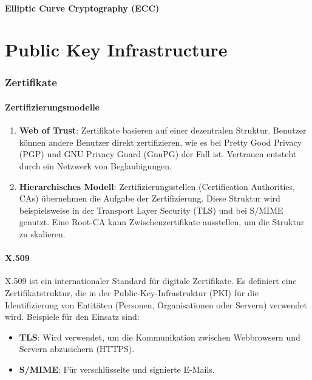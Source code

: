 \documentclass{article}
\begin{document}
\subsection{Elliptic Curve Cryptography (ECC)}




\part{Public Key Infrastructure}

\section{Zertifikate}

\subsection{Zertifizierungsmodelle}
\begin{enumerate}
  \item \textbf{Web of Trust}: Zertifikate basieren auf einer dezentralen Struktur. Benutzer können andere Benutzer direkt zertifizieren, wie es bei Pretty Good Privacy (PGP) und GNU Privacy Guard (GnuPG) der Fall ist. Vertrauen entsteht durch ein Netzwerk von Beglaubigungen.
  \item \textbf{Hierarchisches Modell}: Zertifizierungsstellen (Certification Authorities, CAs) übernehmen die Aufgabe der Zertifizierung. Diese Struktur wird beispielsweise in der Transport Layer Security (TLS) und bei S/MIME genutzt. Eine Root-CA kann Zwischenzertifikate ausstellen, um die Struktur zu skalieren.
\end{enumerate}

\subsection{X.509}

X.509 ist ein internationaler Standard für digitale Zertifikate. Es definiert eine Zertifikatstruktur, die in der Public-Key-Infrastruktur (PKI) für die Identifizierung von Entitäten (Personen, Organisationen oder Servern) verwendet wird. Beispiele für den Einsatz sind:

\begin{itemize}
  \item \textbf{TLS}: Wird verwendet, um die Kommunikation zwischen Webbrowsern und Servern abzusichern (HTTPS).
  \item \textbf{S/MIME}: Für verschlüsselte und signierte E-Mails.
\end{itemize}
\end{document}

